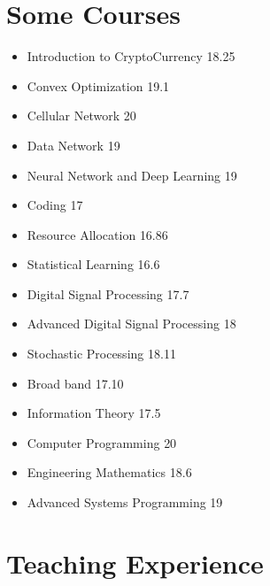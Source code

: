 \documentclass[10pt,a4paper,sans]{moderncv} %
\begin{document}
\section{Some Courses}

\begin{multicols}{2}  %
\begin{itemize}
\item Introduction to CryptoCurrency  \hfill{18.25}
\item Convex Optimization \hfill{19.1}
\item Cellular Network \hfill{20}
\item Data Network \hfill{19}
\item Neural Network and Deep Learning  \hfill{19}
\item Coding \hfill{17}
\item Resource Allocation \hfill{16.86}
\item Statistical Learning \hfill{16.6}
\item Digital Signal Processing                                \hfill{17.7} 
\item Advanced Digital Signal Processing                                \hfill{18} 
\item Stochastic Processing         \hfill{18.11}
\item Broad band         \hfill{17.10} 
\item Information Theory       \hfill{17.5} 
\item Computer Programming            \hfill{20}  
\item Engineering Mathematics           \hfill{18.6} 
\item{Advanced Systems Programming}			\hfill{19}

\end{itemize}
\end{multicols}

\section{Teaching Experience}
\end{document}

